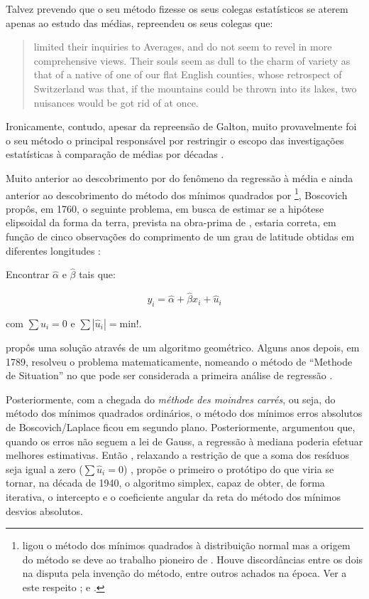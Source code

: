 \documentclass[a4paper, 12pt]{article}
\let\rmarkdownfootnote\footnote%
\def\footnote{\protect\rmarkdownfootnote}
\begin{document}
Talvez prevendo que o seu método fizesse os seus colegas estatísticos se
aterem apenas ao estudo das médias, \textcite[p.~62]{galton}
\autocite[\emph{apud}][p.~350]{koenker2000} repreendeu os seus colegas
que:

\begin{quote}
limited their inquiries to Averages, and do not seem to revel in more
comprehensive views. Their souls seem as dull to the charm of variety as
that of a native of one of our flat English counties, whose retrospect
of Switzerland was that, if the mountains could be thrown into its
lakes, two nuisances would be got rid of at once.
\end{quote}

Ironicamente, contudo, apesar da repreensão de Galton, muito
provavelmente foi o seu método o principal responsável por restringir o
escopo das investigações estatísticas à comparação de médias por décadas
\autocite[350]{koenker2000}.

Muito anterior ao descobrimento por \textcite{galton} do fenômeno da
regressão à média e ainda anterior ao descobrimento do método dos
mínimos quadrados por \textcite{legendre1805} \footnote{\textcite{gauss1809}
  ligou o método dos mínimos quadrados à distribuição normal mas a
  origem do método se deve ao trabalho pioneiro de
  \textcite{legendre1805}. Houve discordâncias entre os dois na disputa
  pela invenção do método, entre outros achados na época. Ver a este
  respeito \textcite{STIGLER197731}; \textcite{stigler1981} e
  \textcite{stigler1986}.}, Boscovich propôs, em 1760, o seguinte
problema, em busca de estimar se a hipótese elipsoidal da forma da
terra, prevista na obra-prima de \textcite{newton}, estaria correta, em
função de cinco observações do comprimento de um grau de latitude
obtidas em diferentes longitudes
\autocites[p.~353]{koenker2000}[p.~281]{tortoise}[p.~40]{stigler1986}:

Encontrar \(\hat \alpha\) e \(\hat \beta\) tais que:

\[y_i = \hat \alpha + \hat \beta x_i + \hat u_i\]

com \(\sum \hat u_i = 0\) e \(\sum |\hat u_i| = \text{min!}\).

\textcite{boscovich} propôs uma solução através de um algoritmo
geométrico. Alguns anos depois, em 1789, \textcite{laplace1789} resolveu
o problema matematicamente, nomeando o método de ``Methode de
Situation'' no que pode ser considerada a primeira análise de regressão
\autocite[281]{tortoise}.

Posteriormente, com a chegada do \emph{méthode des moindres carrés}, ou
seja, do método dos mínimos quadrados ordinários, o método dos mínimos
erros absolutos de Boscovich/Laplace ficou em segundo plano.
Posteriormente, \textcite{edgeworth1887} argumentou que, quando os erros
não seguem a lei de Gauss, a regressão à mediana poderia efetuar
melhores estimativas. Então \textcite{edgeworth1888}, relaxando a
restrição de que a soma dos resíduos seja igual a zero
(\(\sum \hat u_i = 0\)) \autocite[281]{tortoise}, propõe o primeiro o
protótipo do que viria se tornar, na década de 1940, o algoritmo
simplex, capaz de obter, de forma iterativa, o intercepto e o
coeficiente angular da reta do método dos mínimos desvios absolutos.
\end{document}
